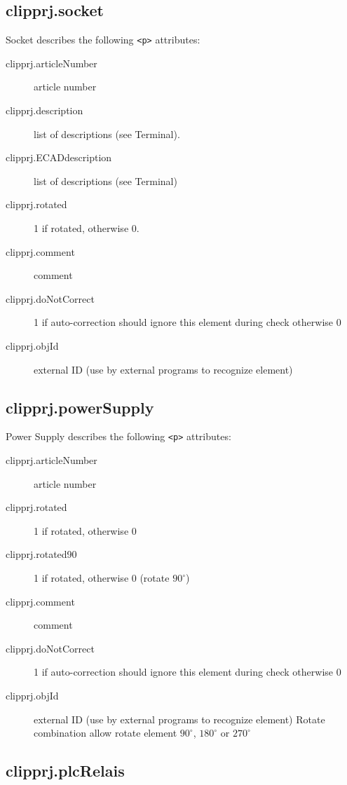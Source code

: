 \documentclass[%
	a4paper,
	oneside,
	listof=numbered,
	parskip=half,
	headsepline=true,
	footsepline=false,
	0.7headlines,
	]{scrbook}
\begin{document}
\subsection{clipprj.socket}
 
Socket describes the following \verb|<p>| attributes: 

\begin{description}
	\item[clipprj.articleNumber] article number 
	\item[clipprj.description] list of descriptions (see Terminal). 
	\item[ clipprj.ECADdescription] list of descriptions (see Terminal) 
	\item[clipprj.rotated] 1 if rotated, otherwise 0. 
	\item[clipprj.comment] comment 
	\item[clipprj.doNotCorrect] 1 if auto-correction should ignore this element during check otherwise 0 
	\item[clipprj.objId] external ID (use by external programs to recognize element) 
\end{description}

\subsection{clipprj.powerSupply}
 
Power Supply describes the following \verb|<p>| attributes: 

\begin{description}
	\item[clipprj.articleNumber] article number
	\item[clipprj.rotated] 1 if rotated, otherwise 0
	\item[clipprj.rotated90] 1 if rotated, otherwise 0 (rotate $90^\circ$) 
	\item[clipprj.comment] comment
	\item[clipprj.doNotCorrect] 1 if auto-correction should ignore this element during check otherwise 0
	\item[clipprj.objId] external ID (use by external programs to recognize element) Rotate combination allow rotate element $90^\circ$, $180^\circ$ or $270^\circ$
\end{description}

\subsection{clipprj.plcRelais}
 
\end{document}
